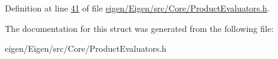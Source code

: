Definition at line \hyperlink{eigen_2_eigen_2src_2_core_2_product_evaluators_8h_source_l00041}{41} of file \hyperlink{eigen_2_eigen_2src_2_core_2_product_evaluators_8h_source}{eigen/\+Eigen/src/\+Core/\+Product\+Evaluators.\+h}.



The documentation for this struct was generated from the following file\+:\begin{DoxyCompactItemize}
\item 
eigen/\+Eigen/src/\+Core/\+Product\+Evaluators.\+h\end{DoxyCompactItemize}
